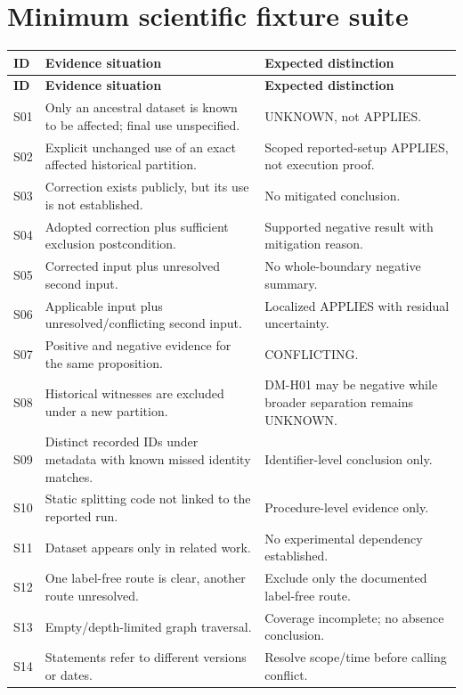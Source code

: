 \documentclass[11pt,a4paper]{article}
\begin{document}
\section{Minimum scientific fixture suite}
\begin{longtable}{@{}L{13mm}L{75mm}L{63mm}@{}}
\toprule
\textbf{ID} & \textbf{Evidence situation} & \textbf{Expected distinction}\\ \midrule
\endfirsthead
\toprule\textbf{ID} & \textbf{Evidence situation} & \textbf{Expected distinction}\\ \midrule\endhead
S01 & Only an ancestral dataset is known to be affected; final use unspecified. & UNKNOWN, not APPLIES.\\
S02 & Explicit unchanged use of an exact affected historical partition. & Scoped reported-setup APPLIES, not execution proof.\\
S03 & Correction exists publicly, but its use is not established. & No mitigated conclusion.\\
S04 & Adopted correction plus sufficient exclusion postcondition. & Supported negative result with mitigation reason.\\
S05 & Corrected input plus unresolved second input. & No whole-boundary negative summary.\\
S06 & Applicable input plus unresolved/conflicting second input. & Localized APPLIES with residual uncertainty.\\
S07 & Positive and negative evidence for the same proposition. & CONFLICTING.\\
S08 & Historical witnesses are excluded under a new partition. & DM-H01 may be negative while broader separation remains UNKNOWN.\\
S09 & Distinct recorded IDs under metadata with known missed identity matches. & Identifier-level conclusion only.\\
S10 & Static splitting code not linked to the reported run. & Procedure-level evidence only.\\
S11 & Dataset appears only in related work. & No experimental dependency established.\\
S12 & One label-free route is clear, another route unresolved. & Exclude only the documented label-free route.\\
S13 & Empty/depth-limited graph traversal. & Coverage incomplete; no absence conclusion.\\
S14 & Statements refer to different versions or dates. & Resolve scope/time before calling conflict.\\

\end{longtable}
\end{document}
